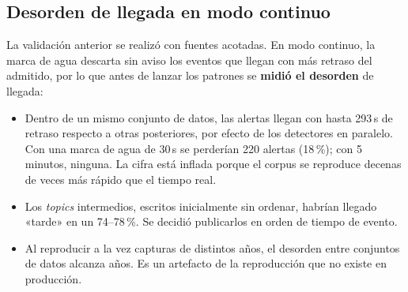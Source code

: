 \subsection{Desorden de llegada en modo continuo}

La validación anterior se realizó con fuentes acotadas. En modo continuo, la marca de agua
descarta sin aviso los eventos que llegan con más retraso del admitido, por lo que antes de
lanzar los patrones se \textbf{midió el desorden} de llegada:

\begin{itemize}
    \item Dentro de un mismo conjunto de datos, las alertas llegan con hasta 293\,s de
    retraso respecto a otras posteriores, por efecto de los detectores en paralelo. Con una
    marca de agua de 30\,s se perderían 220 alertas (18\,\%); con 5 minutos, ninguna. La
    cifra está inflada porque el corpus se reproduce decenas de veces más rápido que el
    tiempo real.
    \item Los \textit{topics} intermedios, escritos inicialmente sin ordenar, habrían
    llegado «tarde» en un 74--78\,\%. Se decidió publicarlos en orden de tiempo de evento.
    \item Al reproducir a la vez capturas de distintos años, el desorden entre conjuntos de
    datos alcanza años. Es un artefacto de la reproducción que no existe en producción.
\end{itemize}
